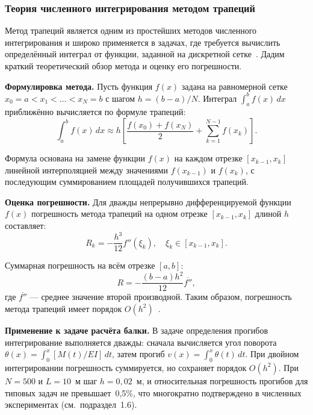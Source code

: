 \subsubsection{Теория численного интегрирования методом трапеций}

Метод трапеций является одним из простейших методов численного интегрирования и широко применяется в задачах, где требуется вычислить определённый интеграл от функции, заданной на дискретной сетке~\cite{bahvalov, samarsky}. Дадим краткий теоретический обзор метода и оценку его погрешности.

\textbf{Формулировка метода.} Пусть функция $f(x)$ задана на равномерной сетке $x_0 = a < x_1 < \ldots < x_N = b$ с шагом $h = (b - a) / N$. Интеграл $\int_a^b f(x) \, dx$ приближённо вычисляется по формуле трапеций:
\begin{equation}
  \int_a^b f(x) \, dx \approx h \left[ \frac{f(x_0) + f(x_N)}{2} + \sum_{k=1}^{N-1} f(x_k) \right].
  \label{eq:trapz_full}
\end{equation}

Формула основана на замене функции $f(x)$ на каждом отрезке $[x_{k-1}, x_k]$ линейной интерполяцией между значениями $f(x_{k-1})$ и $f(x_k)$, с последующим суммированием площадей получившихся трапеций.

\textbf{Оценка погрешности.} Для дважды непрерывно дифференцируемой функции $f(x)$ погрешность метода трапеций на одном отрезке $[x_{k-1}, x_k]$ длиной $h$ составляет:
\begin{equation}
  R_k = -\frac{h^3}{12} f''(\xi_k), \quad \xi_k \in [x_{k-1}, x_k].
  \label{eq:trapz_error_local}
\end{equation}

Суммарная погрешность на всём отрезке $[a, b]$:
\begin{equation}
  R = -\frac{(b - a) h^2}{12} \overline{f''},
  \label{eq:trapz_error_global}
\end{equation}
где $\overline{f''}$ --- среднее значение второй производной. Таким образом, погрешность метода трапеций имеет порядок $O(h^2)$~\cite{bahvalov}.

\textbf{Применение к задаче расчёта балки.} В задаче определения прогибов интегрирование выполняется дважды: сначала вычисляется угол поворота $\theta(x) = \int_0^x [M(t) / EI] \, dt$, затем прогиб $v(x) = \int_0^x \theta(t) \, dt$. При двойном интегрировании погрешность суммируется, но сохраняет порядок $O(h^2)$. При $N = 500$ и $L = 10$~м шаг $h = 0{,}02$~м, и относительная погрешность прогибов для типовых задач не превышает~0{,}5\%, что многократно подтверждено в численных экспериментах (см.~подраздел~1.6).

